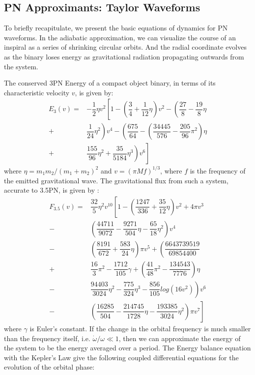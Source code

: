 \documentclass[aps,
prd,
amsmath,
amssymb,
twocolumn,
floatfix,
groupedaddress]{revtex4-1}
\def\l({\left(}
\def\r){\right)}
\begin{document}
\subsection{PN Approximants: Taylor Waveforms}\label{sec:level2:PNWaveforms}
To briefly recapitulate, we present the basic equations of dynamics for PN waveforms. In the adiabatic approximation, we can visualize the course of an inspiral as a series of shrinking circular orbits. And the radial coordinate evolves as the binary loses energy as gravitational radiation propagating outwards from the system.

The conserved 3PN Energy of a compact object binary, in terms of its characteristic velocity $v$, is given by:
\begin{align}\label{eq:E3PN}\nonumber
E_3(v)=&-\dfrac{1}{2}\eta v^2 \left[1- \l(\dfrac{3}{4}+\dfrac{1}{12}\eta\r)v^2 - \l(\dfrac{27}{8}-\dfrac{19}{8}\eta\right.\right.\\ \nonumber
+&\left.\left.\dfrac{1}{24}\eta^2 \r)v^4 - \l(\dfrac{675}{64}-\l(\dfrac{34445}{576}-\dfrac{205}{96}\pi^2\r)\eta\right.\right.\\ 
+&\left.\left.\dfrac{155}{96}\eta^2 +\dfrac{35}{5184}\eta^3\r) v^6\right]
\end{align}
where $\eta=m_1m_2/(m_1+m_2)^2$ and $v=(\pi M f)^{1/3}$, where $f$ is the frequency of the emitted gravitational wave. The gravitational flux from such a system, accurate to 3.5PN, is given by \citep{FluxandE3-5PN}:
\begin{align}\label{eq:Ft3.5PN}\nonumber
F_{3.5}(v) =&\dfrac{32}{5}\eta^2 v^{10}\left[1 - \l(\dfrac{1247}{336}+\dfrac{35}{12}\eta\r)v^2+4\pi v^3\right.\\ \nonumber
-&\left.\l(\dfrac{44711}{9072}-\dfrac{9271}{504}\eta -\dfrac{65}{18}\eta^2 \r)v^4\right.\\ \nonumber
-&\left.\l(\dfrac{8191}{672}+\dfrac{583}{24}\eta\r)\pi v^5+ \l(\dfrac{6643739519}{69854400}\right.\right.\\ \nonumber
+&\left.\left.\dfrac{16}{3}\pi^2 -\dfrac{1712}{105}\gamma +\l(\dfrac{41}{48}\pi^2 -\dfrac{134543}{7776}\r)\eta \right.\right.\\ \nonumber
-&\left.\left.\dfrac{94403}{3024}\eta^2 -\dfrac{775}{324}\eta^3 -\dfrac{856}{105}log(16v^2)\r)v^6\right.\\ 
-&\left.\l(\dfrac{16285}{504}-\dfrac{214745}{1728}\eta -\dfrac{193385}{3024}\eta^2 \r)\pi v^7\right]
\end{align}
where $\gamma$ is Euler's constant. If the change in the orbital frequency is much smaller than the frequency itself, i.e. $\dot{\omega}/\omega \ll 1$, then we can approximate the energy of the system to be the energy averaged over a period. The Energy balance equation with the Kepler's Law give the following coupled differential equations for the evolution of the orbital phase:
\end{document}
